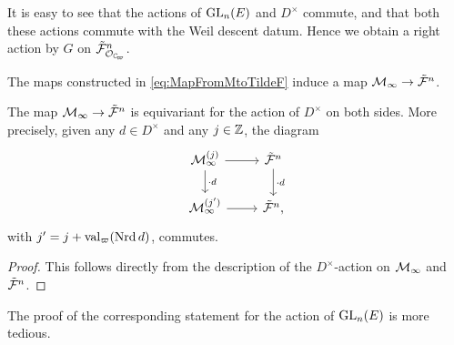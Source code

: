 \documentclass[../main.tex]{subfiles}
\begin{document}
It is easy to see that the actions of $\operatorname{GL}_n(E)$ and $D^\times$ commute,
and that both these actions commute with the Weil descent datum. Hence we
obtain a right action by $G$ on $\tilde \cF^n_{\cO_\Cp}$.

The maps constructed in \eqref{eq:MapFromMtoTildeF} induce a 
map $\mathcal{M}_\infty \to \tilde {\mathcal{F}}^n$.

\begin{lem}\label{lem:EquivarianceForD}
    The map $\mathcal{M}_\infty \to \tilde {\mathcal{F}}^n$ is equivariant 
    for the action of $D^\times$ on both sides. More precisely,
    given any $d \in D^\times$ and any $j \in \mathbb{Z}$, the diagram
    \begin{equation*}
        \begin{tikzcd}[ampersand replacement=\&]
        	{\cM_\infty^{(j)}} \& {\tilde \cF^n} \\
        	{\cM_\infty^{(j')}} \& {\tilde \cF^n},
        	\arrow[from=1-1, to=1-2]
        	\arrow["{\cdot d}", from=1-1, to=2-1]
        	\arrow["{\cdot d}", from=1-2, to=2-2]
        	\arrow[from=2-1, to=2-2]
        \end{tikzcd}
    \end{equation*}
    with $j' = j + \mathrm{val}_\varpi(\operatorname{Nrd} d)$, commutes.
    \begin{proof}
        This follows directly from the description of the $D^\times$-action on $\mathcal{M}_\infty$ and $\tilde {\mathcal{F}}^n$.
    \end{proof}
\end{lem}

The proof of the corresponding statement for the action of $\operatorname{GL}_n(E)$ is more
tedious. 
\end{document}
